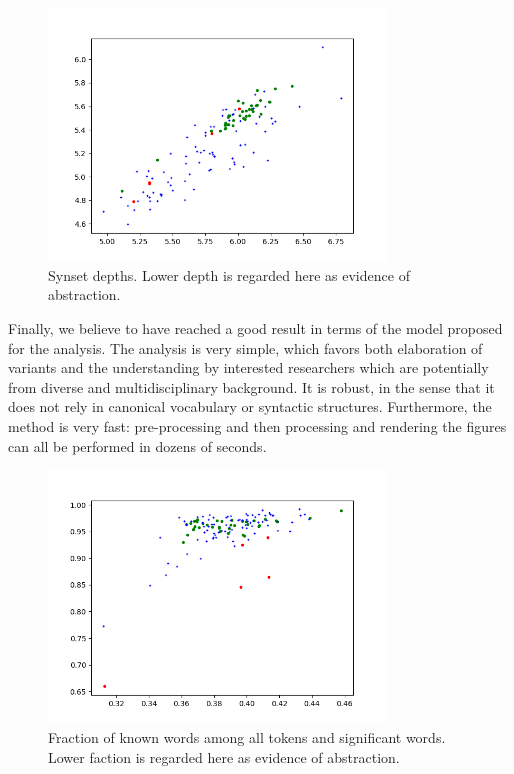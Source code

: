 \documentclass[12pt,fleqn]{article}
\begin{document}
\begin{figure}[!htbp] %
\vspace{-2pt}
\begin{center}
\includegraphics[height=6.7cm,width=9cm]{figs/abst1}%
\caption{Synset depths. Lower depth is regarded here as evidence of abstraction.}
\label{fig:abst1}%
\end{center}
\end{figure}

Finally,
we believe to have reached a good result in terms of the
model proposed for the analysis.
The analysis is very simple, which favors both elaboration of
variants and the understanding by interested researchers which are potentially from
diverse and multidisciplinary background.
It is robust, in the sense that it does not rely in canonical vocabulary or syntactic structures.
Furthermore, the method is very fast:
pre-processing and then processing and rendering the figures can all be performed in dozens of seconds.

\begin{figure}[!htbp] %
\vspace{-2pt}
\begin{center}
\includegraphics[height=6.7cm,width=9cm]{figs/abst2}%
\caption{Fraction of known words among all tokens and significant words.
    Lower faction is regarded here as evidence of abstraction.}
\label{fig:abst2}%
\end{center}
\end{figure}
\end{document}
